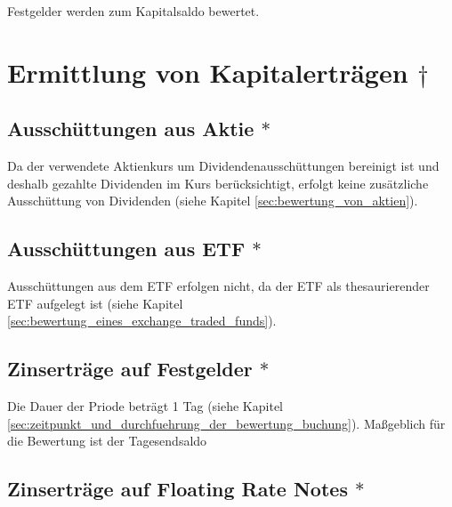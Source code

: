 \documentclass[12pt, a4paper]{article}
\begin{document}
Festgelder werden zum Kapitalsaldo bewertet. 

\section{Ermittlung von Kapitalerträgen $\dagger$}
\label{sec:ermittlung_von_wertpapierertraegen}

\subsection{Ausschüttungen aus Aktie $\ast$}
\label{sec:ausschuettung_aus_aktie}
Da der verwendete Aktienkurs um Dividendenausschüttungen bereinigt ist und deshalb gezahlte Dividenden im Kurs berücksichtigt, erfolgt keine zusätzliche Ausschüttung von Dividenden (siehe Kapitel \ref{sec:bewertung_von_aktien}).

\subsection{Ausschüttungen aus ETF $\ast$}
\label{sec:ausschuettungen_aus_etf}
Ausschüttungen aus dem ETF erfolgen nicht, da der {ETF} als thesaurierender {ETF} aufgelegt ist (siehe Kapitel \ref{sec:bewertung_eines_exchange_traded_funds}).

\subsection{Zinserträge auf Festgelder $\ast$}
\label{sec:zinsertraege_auf_festgelder}
Die Dauer der Priode beträgt 1 Tag (siehe Kapitel \ref{sec:zeitpunkt_und_durchfuehrung_der_bewertung_buchung}).
Maßgeblich für die Bewertung ist der Tagesendsaldo 


\subsection{Zinserträge auf Floating Rate Notes $\ast$}
\label{sec:zinsertraege_auf_floating_rate_notes}

\printbibliography[title={Literatur}]
\end{document}
